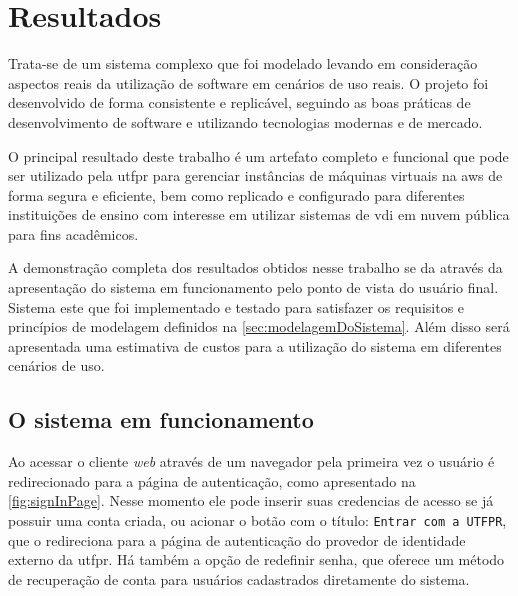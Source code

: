 
\chapter{Resultados}
\label{cap:resultados}

Trata-se de um sistema complexo que foi modelado levando em consideração aspectos reais da utilização de software em cenários de uso reais. O projeto foi desenvolvido de forma consistente e replicável, seguindo as boas práticas de desenvolvimento de software e utilizando tecnologias modernas e de mercado.

O principal resultado deste trabalho é um artefato completo e funcional que pode ser utilizado pela \gls{utfpr} para gerenciar instâncias de máquinas virtuais na \gls{aws} de forma segura e eficiente, bem como replicado e configurado para diferentes instituições de ensino com interesse em utilizar sistemas de \gls{vdi} em nuvem pública para fins acadêmicos.

A demonstração completa dos resultados obtidos nesse trabalho se da através da apresentação do sistema em funcionamento pelo ponto de vista do usuário final. Sistema este que foi implementado e testado para satisfazer os requisitos e princípios de modelagem definidos na \autoref{sec:modelagemDoSistema}. Além disso será apresentada uma estimativa de custos para a utilização do sistema em diferentes cenários de uso.

\section{O sistema em funcionamento}
\label{sec:oSistemaEmFuncionamento}

Ao acessar o cliente \textit{web} através de um navegador pela primeira vez o usuário é redirecionado para a página de autenticação, como apresentado na \autoref{fig:signInPage}. Nesse momento ele pode inserir suas credencias de acesso se já possuir uma conta criada, ou acionar o botão com o título: \texttt{Entrar com a UTFPR}, que o redireciona para a página de autenticação do provedor de identidade externo da \gls{utfpr}. Há também a opção de redefinir senha, que oferece um método de recuperação de conta para usuários cadastrados diretamente do sistema.



